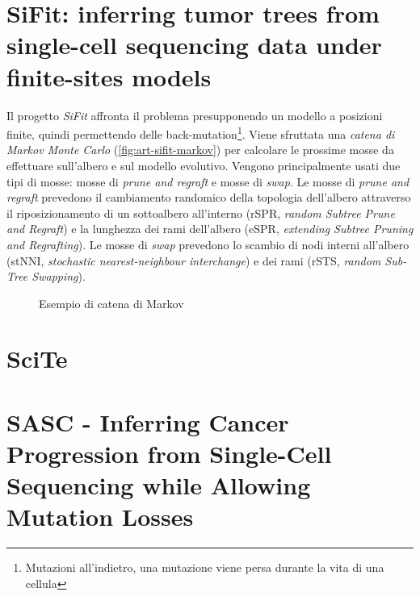 
\section{SiFit: inferring tumor trees from single-cell sequencing data under finite-sites models}
\label{chap:art-sifit}
Il progetto \textit{SiFit} affronta il problema presupponendo un modello a posizioni finite, quindi permettendo delle back-mutation\footnote{Mutazioni all'indietro, una mutazione viene persa durante la vita di una cellula}. Viene sfruttata una \textit{catena di Markov Monte Carlo} (\autoref{fig:art-sifit-markov}) per calcolare le prossime mosse da effettuare sull'albero e sul modello evolutivo. Vengono principalmente usati due tipi di mosse: mosse di \textit{prune and regraft} e mosse di \textit{swap}. Le mosse di \textit{prune and regraft} prevedono il cambiamento randomico della topologia dell'albero attraverso il riposizionamento di un sottoalbero all'interno (rSPR, \textit{random Subtree Prune and Regraft}) e la lunghezza dei rami dell'albero (eSPR, \textit{extending Subtree Pruning and Regrafting}). Le mosse di \textit{swap} prevedono lo scambio di nodi interni all'albero (stNNI, \textit{stochastic nearest-neighbour interchange}) e dei rami (rSTS, \textit{random Sub-Tree Swapping}).

\begin{figure}[h]
    \centering
     \caption{Esempio di catena di Markov}
    \label{fig:art-sifit-markov}
\end{figure}

\section{SciTe}
\label{chap:art-scite}

\section{SASC - Inferring Cancer Progression from Single-Cell Sequencing while Allowing Mutation Losses \cite{SCiccolellaSasc}}
\label{chap:art-sasc}
